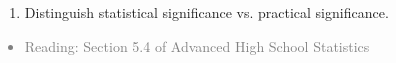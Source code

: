 \documentclass[11pt]{article}
\newcommand{\gray}[1]{\textcolor{gray}{#1}}
\begin{document}
\begin{enumerate}[resume]
\renewcommand\labelenumi{\textcolor{light}{\textbf{LO \theenumi.}}}




\item Distinguish statistical significance vs. practical significance.

\end{enumerate}

\gray{
{\it
\vspace{-0.5cm}
\begin{itemize}
\renewcommand{\labelitemi}{{\textcolor{dark}{$\ast$}}}
\item Reading: Section 5.4 of Advanced High School Statistics 
\end{itemize}
}}
\end{document}
